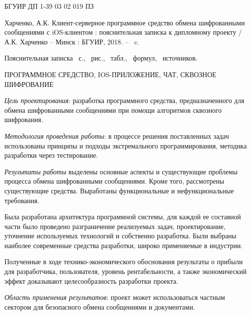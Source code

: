 \thispagestyle{empty}


БГУИР ДП 1-39 03 02 019 ПЗ

Харченко, А.К. Клиент-серверное программное средство обмена шифрованными сообщениями с iOS-клиентом : пояснительная записка к дипломному проекту / А.К. Харченко -- Минск : БГУИР, 2018. -- \totalpages~c.

Пояснительная записка \totalpages~с., \totfig{}~рис., \tottab{}~табл., \toteq{}~формул, \totref{}~источников.

\MakeUppercase{Программное средство, iOS-приложение, чат, сквозное шифрование}


\textit{Цель проектирования}: разработка программного средства, предназначенного для обмена шифрованными сообщениями при помощи алгоритмов сквозного шифрования. 

\textit{Методология проведения работы}: в процессе решения поставленных задач использованы принципы и подходы экстремального программирования, методика разработки через тестирование.

\textit{Результаты работы} выделены основные аспекты и существующие проблемы процесса обмена шифрованными сообщениями. Кроме того, рассмотрены существующие средства. Выработаны функциональные и нефункциональные требования.

Была разработана архитектура программной системы, для каждой ее составной части было проведено разграничение реализуемых задач, проектирование, уточнение используемых технологий и собственно разработка. Были выбраны наиболее современные средства разработки, широко применяемые в индустрии. 

Полученные в ходе технико-экономического обоснования результаты о прибыли для разработчика, пользователя, уровень рентабельности, а также экономический эффект доказывают целесообразность разработки про\-екта.

\textit{Область применения результатов}: проект может использоваться частным сектором для безопасного обмена сообщениями и документами.